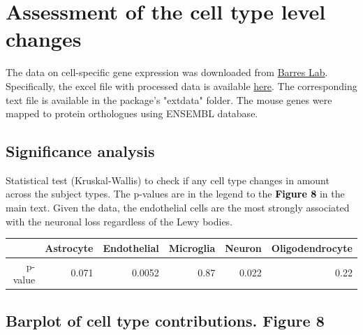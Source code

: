 \documentclass[11pt]{article}\usepackage[]{graphicx}\usepackage[usenames,dvipsnames]{color}
\begin{document}
\section{Assessment of the cell type level changes}

The data on cell-specific gene expression was downloaded from 
\href{http://web.stanford.edu/group/barres_lab/brain_rnaseq.html}{Barres Lab}.
Specifically, the excel file with processed data is available
\href{http://web.stanford.edu/group/barres_lab/barreslab_rnaseq.xlsx}{here}.
The corresponding text file is available in the package's "extdata" folder.
The mouse genes were mapped to protein orthologues using ENSEMBL database.









\subsection{Significance analysis}

Statistical test (Kruskal-Wallis) to check if any cell type changes in 
amount across the subject types. 
The p-values are in the legend to the 
\textcolor{black}{\colorbox{highlighter}{\textbf{Figure 8}}} in the main text. 
Given the data, the endothelial cells are the most strongly associated 
with the neuronal loss regardless of the Lewy bodies.

\begin{table}[ht]
\centering
\begin{tabular}{rrrrrr}
  \hline
 & Astrocyte & Endothelial & Microglia & Neuron & Oligodendrocyte \\ 
  \hline
p-value & 0.071 & 0.0052 & 0.87 & 0.022 & 0.22 \\ 
   \hline
\end{tabular}
\end{table}


\subsection{Barplot of cell type contributions. Figure 8}
\end{document}

